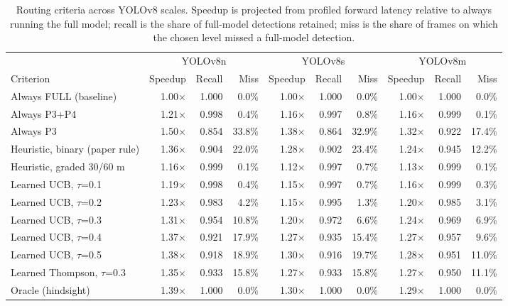 \begin{table}[t]
\centering
\small
\begin{tabular}{lrrrrrrrrr}
\toprule
 & \multicolumn{3}{c}{YOLOv8n} & \multicolumn{3}{c}{YOLOv8s} & \multicolumn{3}{c}{YOLOv8m} \\
\cmidrule(lr){2-4}\cmidrule(lr){5-7}\cmidrule(lr){8-10}
Criterion & Speedup & Recall & Miss & Speedup & Recall & Miss & Speedup & Recall & Miss \\
\midrule
Always FULL (baseline) & 1.00$\times$ & 1.000 & 0.0\% & 1.00$\times$ & 1.000 & 0.0\% & 1.00$\times$ & 1.000 & 0.0\% \\
Always P3+P4 & 1.21$\times$ & 0.998 & 0.4\% & 1.16$\times$ & 0.997 & 0.8\% & 1.16$\times$ & 0.999 & 0.1\% \\
Always P3 & 1.50$\times$ & 0.854 & 33.8\% & 1.38$\times$ & 0.864 & 32.9\% & 1.32$\times$ & 0.922 & 17.4\% \\
Heuristic, binary (paper rule) & 1.36$\times$ & 0.904 & 22.0\% & 1.28$\times$ & 0.902 & 23.4\% & 1.24$\times$ & 0.945 & 12.2\% \\
Heuristic, graded 30/60 m & 1.16$\times$ & 0.999 & 0.1\% & 1.12$\times$ & 0.997 & 0.7\% & 1.13$\times$ & 0.999 & 0.1\% \\
\midrule
Learned UCB, $\tau$=0.1 & 1.19$\times$ & 0.998 & 0.4\% & 1.15$\times$ & 0.997 & 0.7\% & 1.16$\times$ & 0.999 & 0.3\% \\
Learned UCB, $\tau$=0.2 & 1.23$\times$ & 0.983 & 4.2\% & 1.15$\times$ & 0.995 & 1.3\% & 1.20$\times$ & 0.985 & 3.1\% \\
Learned UCB, $\tau$=0.3 & 1.31$\times$ & 0.954 & 10.8\% & 1.20$\times$ & 0.972 & 6.6\% & 1.24$\times$ & 0.969 & 6.9\% \\
Learned UCB, $\tau$=0.4 & 1.37$\times$ & 0.921 & 17.9\% & 1.27$\times$ & 0.935 & 15.4\% & 1.27$\times$ & 0.957 & 9.6\% \\
Learned UCB, $\tau$=0.5 & 1.38$\times$ & 0.918 & 18.9\% & 1.30$\times$ & 0.916 & 19.7\% & 1.28$\times$ & 0.951 & 11.0\% \\
Learned Thompson, $\tau$=0.3 & 1.35$\times$ & 0.933 & 15.8\% & 1.27$\times$ & 0.933 & 15.8\% & 1.27$\times$ & 0.950 & 11.1\% \\
\midrule
Oracle (hindsight) & 1.39$\times$ & 1.000 & 0.0\% & 1.30$\times$ & 1.000 & 0.0\% & 1.29$\times$ & 1.000 & 0.0\% \\
\bottomrule
\end{tabular}
\caption{Routing criteria across YOLOv8 scales. Speedup is projected from profiled forward latency relative to always running the full model; recall is the share of full-model detections retained; miss is the share of frames on which the chosen level missed a full-model detection.}
\label{tab:routing-criteria}
\end{table}

